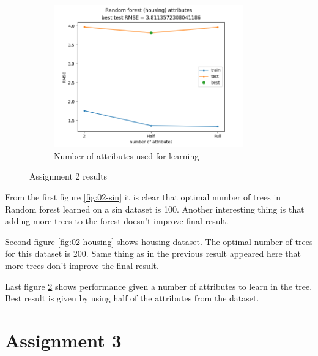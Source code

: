 \documentclass[12pt]{article}
\begin{document}
\begin{figure}[!h]
\begin{subfigure}[b]{0.49\textwidth}
        \includegraphics[width=0.9\textwidth]{plots/02/03-attributes.png}
        \caption{Number of attributes used for learning}
        \label{fig:02-attributes}
    \end{subfigure}
    \caption{Assignment 2 results}
\end{figure}

From the first figure \ref{fig:02-sin} it is clear that optimal number of trees in Random forest learned on a sin dataset is 100. Another interesting thing is that adding more trees to the forest doesn't improve final result.

Second figure \ref{fig:02-housing} shows housing dataset. The optimal number of trees for this dataset is 200. Same thing as in the previous result appeared here that more trees don't improve the final result.

Last figure \ref{fig:02-attributes} shows performance given a number of attributes to learn in the tree. Best result is given by using half of the attributes from the dataset.

\newpage

\section{Assignment 3}
\end{document}
